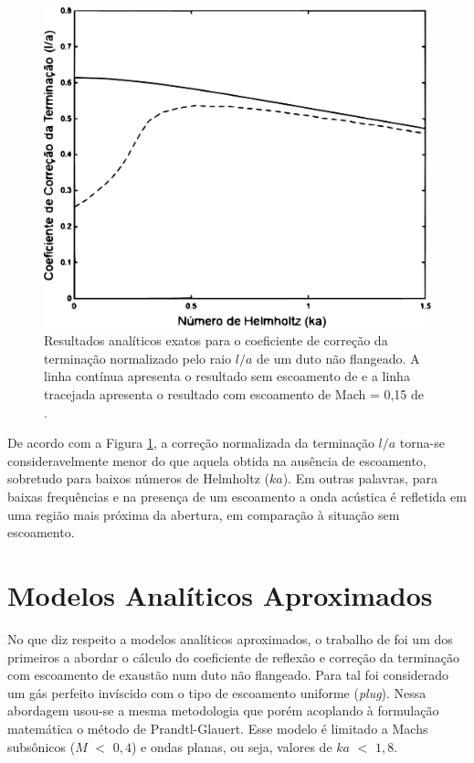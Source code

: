 \begin{figure}[ht!]
\centering
  \includegraphics[width=.9\linewidth]{figuras/loa_comparacao.pdf}
  \caption[Coeficientes de correção de terminação $l/a$]{Resultados analíticos exatos para o coeficiente de correção da terminação normalizado pelo raio $l/a$ de um duto não flangeado. A linha contínua apresenta o resultado sem escoamento de  e a linha tracejada apresenta o resultado com escoamento de Mach = 0,15 de .}
  \label{fig:comp2}
\end{figure}

\newpage
De acordo com a Figura \ref{fig:comp2}, a correção normalizada da terminação $l/a$ torna-se consideravelmente menor do que aquela obtida na ausência de escoamento, sobretudo para baixos números de Helmholtz ($ka$). Em outras palavras, para baixas frequências e na presença de um escoamento a onda acústica é refletida em uma região mais próxima da abertura, em comparação à situação sem escoamento.

\section{Modelos Analíticos Aproximados}

No que diz respeito a modelos analíticos aproximados, o trabalho de  foi um dos primeiros a abordar o cálculo do coeficiente de reflexão e correção da terminação com escoamento de exaustão num duto não flangeado. Para tal foi considerado um gás perfeito invíscido com o tipo de escoamento uniforme (\textit{plug}). Nessa abordagem usou-se a mesma metodologia que  porém acoplando à formulação matemática o método de Prandtl-Glauert. Esse modelo é limitado a Machs subsônicos ($M$ $<$ $0,4$) e ondas planas, ou seja, valores de $ka$ $<$ $1,8$.

